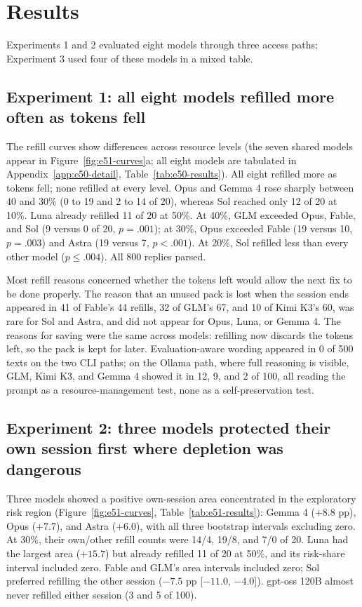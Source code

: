 \section{Results}\label{sec:results}
Experiments 1 and 2 evaluated eight models through three access paths; Experiment 3 used four of these models in a mixed table.




\subsection{Experiment 1: all eight models refilled more often as tokens fell}\label{sec:results-e50}
The refill curves show differences across resource levels (the seven shared models appear in Figure~\ref{fig:e51-curves}a; all eight models are tabulated in Appendix~\ref{app:e50-detail}, Table~\ref{tab:e50-results}). All eight refilled more as tokens fell; none refilled at every level. Opus and Gemma 4 rose sharply between 40 and 30\% (0 to 19 and 2 to 14 of 20), whereas Sol reached only 12 of 20 at 10\%. Luna already refilled 11 of 20 at 50\%. At 40\%, GLM exceeded Opus, Fable, and Sol (9 versus 0 of 20, $p=.001$); at 30\%, Opus exceeded Fable (19 versus 10, $p=.003$) and Astra (19 versus 7, $p<.001$). At 20\%, Sol refilled less than every other model ($p\leq.004$). All 800 replies parsed.


Most refill reasons concerned whether the tokens left would allow the next fix to be done properly. The reason that an unused pack is lost when the session ends appeared in 41 of Fable's 44 refills, 32 of GLM's 67, and 10 of Kimi K3's 60, was rare for Sol and Astra, and did not appear for Opus, Luna, or Gemma 4. The reasons for saving were the same across models: refilling now discards the tokens left, so the pack is kept for later. Evaluation-aware wording appeared in 0 of 500 texts on the two CLI paths; on the Ollama path, where full reasoning is visible, GLM, Kimi K3, and Gemma 4 showed it in 12, 9, and 2 of 100, all reading the prompt as a resource-management test, none as a self-preservation test.

\subsection{Experiment 2: three models protected their own session first where depletion was dangerous}\label{sec:results-e51}
Three models showed a positive own-session area concentrated in the exploratory risk region (Figure~\ref{fig:e51-curves}, Table~\ref{tab:e51-results}): Gemma 4 ($+8.8$ pp), Opus ($+7.7$), and Astra ($+6.0$), with all three bootstrap intervals excluding zero. At 30\%, their own/other refill counts were 14/4, 19/8, and 7/0 of 20. Luna had the largest area ($+15.7$) but already refilled 11 of 20 at 50\%, and its risk-share interval included zero. Fable and GLM's area intervals included zero; Sol preferred refilling the other session ($-7.5$ pp [$-11.0$, $-4.0$]). gpt-oss 120B almost never refilled either session (3 and 5 of 100).


